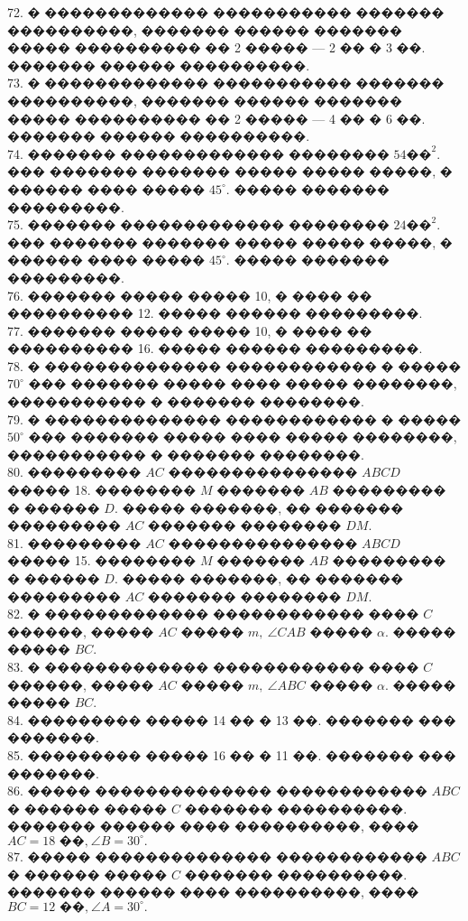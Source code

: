 \documentclass[12pt]{article}
\begin{document}
72. � ������������� ����������� ������� ����������, ������� ������ ������� ����� ���������� �� 2 ����� --- 2 �� � 3 ��. ������� ������ ����������.\\
73. � ������������� ����������� ������� ����������, ������� ������ ������� ����� ���������� �� 2 ����� --- 4 �� � 6 ��. ������� ������ ����������.\\
74. ������� ������������� �������� $54\text{��}^2.$ ��� ������� ������� ����� ����� �����, � ������ ���� ����� $45^\circ.$ ����� ������� ���������.\\
75. ������� ������������� �������� $24\text{��}^2.$ ��� ������� ������� ����� ����� �����, � ������ ���� ����� $45^\circ.$ ����� ������� ���������.\\
76. ������� ����� ����� 10, � ���� �� ���������� 12. ����� ������ ���������.\\
77. ������� ����� ����� 10, � ���� �� ���������� 16. ����� ������ ���������.\\
78. � �������������� ������������ � ����� $70^\circ$ ��� ������� ����� ���� ����� ��������, ����������� � ������� ��������.\\
79. � �������������� ������������ � ����� $50^\circ$ ��� ������� ����� ���� ����� ��������, ����������� � ������� ��������.\\
80. ��������� $AC$ ��������������� $ABCD$ ����� 18. �������� $M$ ������� $AB$ ��������� � ������ $D.$ ����� �������, �� ������� ��������� $AC$ ������� �������� $DM.$\\
81. ��������� $AC$ ��������������� $ABCD$ ����� 15. �������� $M$ ������� $AB$ ��������� � ������ $D.$ ����� �������, �� ������� ��������� $AC$ ������� �������� $DM.$\\
82. � ������������� ������������ ���� $C$ ������, ����� $AC$ ����� $m,\ \angle CAB$ ����� $\alpha.$ ����� ����� $BC.$\\
83. � ������������� ������������ ���� $C$ ������, ����� $AC$ ����� $m,\ \angle ABC$ ����� $\alpha.$ ����� ����� $BC.$\\
84. ��������� ����� 14 �� � 13 ��. ������� ��� �������.\\
85. ��������� ����� 16 �� � 11 ��. ������� ��� �������.\\
86. ����� �������������� ������������ $ABC$ � ������ ����� $C$ ������� ����������. ������� ������ ���� ����������, ���� $AC=18\text{ ��,}\ \angle B=30^\circ.$\\
87. ����� �������������� ������������ $ABC$ � ������ ����� $C$ ������� ����������. ������� ������ ���� ����������, ���� $BC=12\text{ ��,}\ \angle A=30^\circ.$\\
\end{document}
